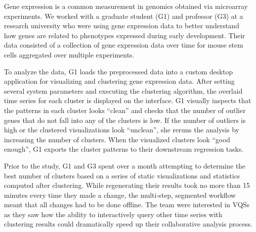 \par\noindent{} Gene expression is a common measurement in genomics obtained via microarray experiments.  We worked with a graduate student (G1) and professor (G3) at a research university who were using gene expression data to better understand how genes are related to phenotypes expressed during early development. Their data consisted of a collection of gene expression data over time for mouse stem cells aggregated over multiple experiments. %
\par To analyze the data, G1 loads the preprocessed data into a custom desktop application for visualizing and clustering gene expression data. After setting several system parameters and executing the clustering algorithm, the overlaid time series for each cluster is displayed on the interface. G1 visually inspects that the patterns in each cluster looks ``clean'' and checks that the number of outlier genes that do not fall into any of the clusters is low.  If the number of outliers is high or the clustered visualizations look ``unclean'', she reruns the analysis by increasing the number of clusters. When the visualized clusters look ``good enough'', G1 exports the cluster patterns to their downstream regression tasks.
\par Prior to the study, G1 and G3 spent over a month attempting to determine the best number of clusters based on a series of static visualizations and statistics computed after clustering. While regenerating their results took no more than 15 minutes every time they made a change, the multi-step, segmented workflow meant that all changes had to be done offline. The team were interested in VQSs as they saw how the ability to interactively query other time series with clustering results could dramatically speed up their collaborative analysis process.
